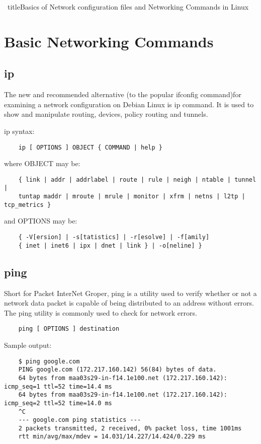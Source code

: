 \documentclass[a4paper,12pt]{article}
\begin{document}
    \	title{Basics of Network configuration files and Networking Commands in Linux}
    \author{Yadhukrishnan M}
    \date{\today}
    \maketitle
    
    \section{Basic Networking Commands}
    
    \subsection{ip}
    The new and recommended alternative (to the popular ifconfig command)for examining a network configuration on Debian Linux is ip command.
    It is used to show and manipulate routing, devices, policy routing and tunnels.
    
    ip syntax:
    \begin{verbatim}
    ip [ OPTIONS ] OBJECT { COMMAND | help }
    \end{verbatim}
    
    where OBJECT may be:
    \begin{verbatim}
    { link | addr | addrlabel | route | rule | neigh | ntable | tunnel |
    tuntap maddr | mroute | mrule | monitor | xfrm | netns | l2tp | tcp_metrics }
    \end{verbatim}
    
    and OPTIONS may be:
    \begin{verbatim}
    { -V[ersion] | -s[tatistics] | -r[esolve] | -f[amily]
    { inet | inet6 | ipx | dnet | link } | -o[neline] }
    \end{verbatim}
    
    \subsection{ping}
     Short for Packet InterNet Groper, ping is a utility used to verify whether or not a network data packet is capable of being distributed to an address without errors. The ping utility is commonly used to check for network errors.
    \begin{verbatim}
    ping [ OPTIONS ] destination
    \end{verbatim}
    
    Sample output:
    \begin{verbatim}
    $ ping google.com
    PING google.com (172.217.160.142) 56(84) bytes of data.
    64 bytes from maa03s29-in-f14.1e100.net (172.217.160.142): icmp_seq=1 ttl=52 time=14.4 ms
    64 bytes from maa03s29-in-f14.1e100.net (172.217.160.142): icmp_seq=2 ttl=52 time=14.0 ms
    ^C
    --- google.com ping statistics ---
    2 packets transmitted, 2 received, 0% packet loss, time 1001ms
    rtt min/avg/max/mdev = 14.031/14.227/14.424/0.229 ms
    
    \end{verbatim}
    
\end{document}
